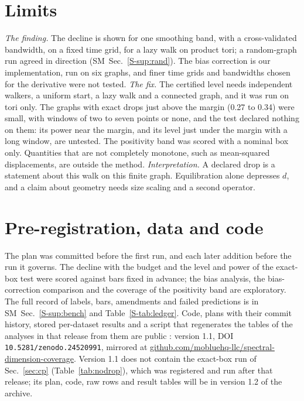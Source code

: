 \documentclass[aps,pre,twocolumn,superscriptaddress,nofootinbib,10pt]{revtex4-2}
\newcommand{\SM}{SM}
\begin{document}
\section{Limits}\label{sec:limits}\label{sec:rec}
\emph{The finding.} The decline is shown for one smoothing band, with a cross-validated bandwidth, on a fixed time grid, for a lazy walk on product tori; a random-graph run agreed in direction (\SM\ Sec.~\ref{S-sup:rand}). The bias correction is our implementation, run on six graphs, and finer time grids and bandwidths chosen for the derivative were not tested. \emph{The fix.} The certified level needs independent walkers, a uniform start, a lazy walk and a connected graph, and it was run on tori only. The graphs with exact drops just above the margin (0.27 to 0.34) were small, with windows of two to seven points or none, and the test declared nothing on them: its power near the margin, and its level just under the margin with a long window, are untested. The positivity band was scored with a nominal box only. Quantities that are not completely monotone, such as mean-squared displacements, are outside the method. \emph{Interpretation.} A declared drop is a statement about this walk on this finite graph. Equilibration alone depresses $d$, and a claim about geometry needs size scaling and a second operator.

\section*{Pre-registration, data and code}
The plan was committed before the first run, and each later addition before the run it governs. The decline with the budget and the level and power of the exact-box test were scored against bars fixed in advance; the bias analysis, the bias-correction comparison and the coverage of the positivity band are exploratory. The full record of labels, bars, amendments and failed predictions is in \SM\ Sec.~\ref{S-sup:bench} and Table~\ref{S-tab:ledger}. Code, plans with their commit history, stored per-dataset results and a script that regenerates the tables of the analyses in that release from them are public \cite{archive2026}: version 1.1, DOI \texttt{10.5281/zenodo.24520991}, mirrored at {\footnotesize\mbox{\url{github.com/mobluehq-llc/spectral-dimension-coverage}}}. Version 1.1 does not contain the exact-box run of Sec.~\ref{sec:cp} (Table~\ref{tab:nodrop}), which was registered and run after that release; its plan, code, raw rows and result tables will be in version 1.2 of the archive.
\end{document}
